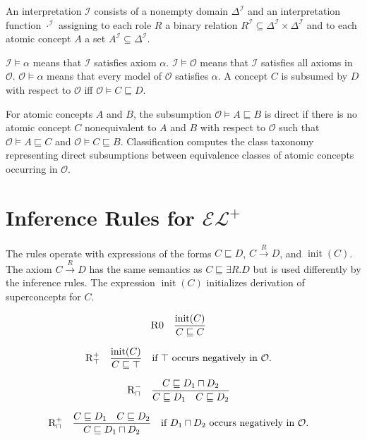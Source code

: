 \documentclass[11pt]{article}
\newcommand{\Ont}{\mathcal O}
\newcommand{\interp}{\mathcal I}
\newcommand{\DeltaI}{\Delta^{\interp}}
\newcommand{\roleI}[1]{#1^{\interp}}
\newcommand{\conceptI}[1]{#1^{\interp}}
\newcommand{\sub}{\sqsubseteq}
\newcommand{\init}{\operatorname{init}}
\begin{document}
An interpretation $\interp$ consists of a nonempty domain $\DeltaI$ and an interpretation function $\cdot^{\interp}$ assigning to each role $R$ a binary relation $\roleI{R} \subseteq \DeltaI \times \DeltaI$ and to each atomic concept $A$ a set $\conceptI{A} \subseteq \DeltaI$.

$\interp \models \alpha$ means that $\interp$ satisfies axiom $\alpha$. $\interp \models \Ont$ means that $\interp$ satisfies all axioms in $\Ont$. $\Ont \models \alpha$ means that every model of $\Ont$ satisfies $\alpha$. A concept $C$ is subsumed by $D$ with respect to $\Ont$ iff $\Ont \models C \sub D$.

For atomic concepts $A$ and $B$, the subsumption $\Ont \models A \sub B$ is direct if there is no atomic concept $C$ nonequivalent to $A$ and $B$ with respect to $\Ont$ such that $\Ont \models A \sub C$ and $\Ont \models C \sub B$. Classification computes the class taxonomy representing direct subsumptions between equivalence classes of atomic concepts occurring in $\Ont$.

\section{Inference Rules for $\mathcal{EL}^{+}$}

The rules operate with expressions of the forms $C \sub D$, $C \xrightarrow{R} D$, and $\init(C)$. The axiom $C \xrightarrow{R} D$ has the same semantics as $C \sub \exists R.D$ but is used differently by the inference rules. The expression $\init(C)$ initializes derivation of superconcepts for $C$.

\begin{align*}
\textsc{R0} \quad& \frac{\init(C)}{C \sub C}
\end{align*}

\begin{align*}
\textsc{R}_{\top}^{+} \quad&
\frac{\init(C)}{C \sub \top}
\quad \text{if } \top \text{ occurs negatively in } \Ont.
\end{align*}

\begin{align*}
\textsc{R}_{\sqcap}^{-} \quad&
\frac{C \sub D_1 \sqcap D_2}{C \sub D_1 \quad C \sub D_2}
\end{align*}

\begin{align*}
\textsc{R}_{\sqcap}^{+} \quad&
\frac{C \sub D_1 \quad C \sub D_2}{C \sub D_1 \sqcap D_2}
\quad \text{if } D_1 \sqcap D_2 \text{ occurs negatively in } \Ont.
\end{align*}
\end{document}

